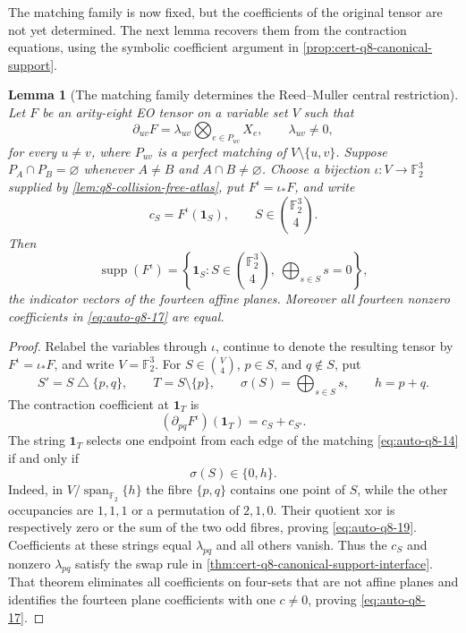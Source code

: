 \documentclass[11pt,letterpaper,onecolumn]{article}
\theoremstyle{plain}
\newtheorem{lemma}[lemma]{Lemma}
\theoremstyle{definition}
\theoremstyle{remark}
\newcommand{\Ftwo}{\mathbb F_2}
\newcommand{\Span}{\operatorname{span}}
\newcommand{\supp}{\operatorname{supp}}
\newcommand{\one}{\mathbf 1}
\begin{document}
	The matching family is now fixed, but the coefficients of the original
	tensor are not yet determined. The next lemma recovers them from the
    contraction equations, using the symbolic coefficient argument in
    \cref{prop:cert-q8-canonical-support}.
	\begin{lemma}[The matching family determines the Reed--Muller central restriction]
		\label{lem:q8-canonical-support}
		Let \(F\) be an arity-eight EO tensor on a variable set \(V\) such that
		\[
		\partial_{uv}F
		=\lambda_{uv}\bigotimes_{e\in P_{uv}}X_e,
		\qquad \lambda_{uv}\ne0,
		\]
		for every $u\ne v$, where $P_{uv}$ is a perfect matching of
		$V\setminus\{u,v\}$.  Suppose \(P_A\cap P_B=\varnothing\) whenever
		\(A\ne B\) and \(A\cap B\ne\varnothing\).  Choose a bijection
		\(\iota:V\to\Ftwo^3\) supplied by
		\cref{lem:q8-collision-free-atlas}, put \(F^\iota=\iota_*F\), and
		write
		\[
		c_S=F^\iota(\one_S),
		\qquad S\in\binom{\Ftwo^3}4.
		\]
		Then
		\begin{equation}
		\supp(F^\iota)
		=\left\{\one_S:
		S\in\binom{\Ftwo^3}4,\ 
		\bigoplus_{s\in S}s=0\right\},
		\label{eq:auto-q8-17}
		\end{equation}
		the indicator vectors of the fourteen affine planes.  Moreover all fourteen nonzero
		coefficients in \eqref{eq:auto-q8-17} are equal.
	\end{lemma}
	
	\begin{proof}
		Relabel the variables through \(\iota\), continue to denote the resulting tensor
		by \(F^\iota=\iota_*F\), and write \(V=\Ftwo^3\).  For
		$S\in\binom V4$, $p\in S$, and $q\notin S$, put
		\[
		S'=S\mathbin\triangle\{p,q\},\qquad
		T=S\setminus\{p\},\qquad
		\sigma(S)=\bigoplus_{s\in S}s,\qquad h=p+q.
		\]
        The contraction coefficient at $\one_T$ is
		\[
		(\partial_{pq}F^\iota)(\one_T)=c_S+c_{S'}.
		\]
		The string \(\one_T\) selects one endpoint from each edge of the
		matching \eqref{eq:auto-q8-14} if and only if
		\begin{equation}
		\sigma(S)\in\{0,h\}.
		\label{eq:auto-q8-19}
		\end{equation}
		Indeed, in $V/\Span_{\Ftwo}\{h\}$ the fibre $\{p,q\}$ contains one point of
		$S$, while the other occupancies are $1,1,1$ or a permutation of $2,1,0$.
		Their quotient xor is respectively zero or the sum of the two odd fibres,
		proving \eqref{eq:auto-q8-19}.
		Coefficients at these strings equal $\lambda_{pq}$ and all others vanish.
		Thus the \(c_S\) and nonzero \(\lambda_{pq}\) satisfy the swap rule in
		\cref{thm:cert-q8-canonical-support-interface}.  That theorem eliminates
		all coefficients on four-sets that are not affine planes and identifies
		the fourteen plane coefficients
		with one \(c\ne0\), proving \eqref{eq:auto-q8-17}.
	\end{proof}
	
\end{document}
